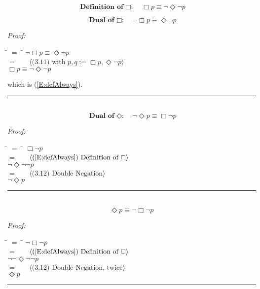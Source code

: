 \documentclass[fleqn, leqno]{article}
\newcommand{\lgap}{2pt}                             %
\newcommand{\mymathindent}{24pt}                      %
\newcommand{\Event}{\Diamond}
\newcommand{\Always}{\Box}
\newcommand{\myqed}{\hfill\rule[-.23ex]{1.2ex}{2.0ex}}
\newcommand{\Gll} {\langle}                         %
\newcommand{\Ggg} {\rangle}                         %
\newcommand{\Hint}[1]     {\ \ \ $\Gll              \mbox{#1} \Ggg$ }   %
\begin{document}
\begin{equation}\label{E:defAlways}
\textbf{Definition of $\Always$:}\quad \Always p \equiv \lnot\Event\lnot p
\end{equation}

\begin{equation}\label{E:dualAlways}
\textbf{Dual of $\Always$:}\quad \lnot\Always p \equiv \Event\lnot p
\end{equation}

\emph{Proof:}
\begin{tabbing}
\hspace{\mymathindent} \= $= \;$ \= \kill
  \> \>   $\lnot\Always p \equiv \Event\lnot p$\\[\lgap]
  \> $=$  \>  \Hint{(3.11) with $p,q := \Always p, \Event\lnot p$}\\[\lgap]
  \> \>   $\Always p \equiv \lnot\Event\lnot p$
\end{tabbing}
which is (\ref{E:defAlways}). \myqed\\[\lgap]


\begin{equation}\label{E:dualEvent}
\textbf{Dual of $\Event$:}\quad \lnot\Event p \equiv \Always\lnot p
\end{equation}

\emph{Proof:}
\begin{tabbing}
\hspace{\mymathindent} \= $= \;$ \= \kill
  \> \>   $\Always\lnot p$\\[\lgap]
  \> $=$  \>  \Hint{(\ref{E:defAlways}) Definition of $\Always$}\\[\lgap]
  \> \>   $\lnot\Event\lnot\lnot p$\\[\lgap]
  \> $=$  \>  \Hint{(3.12) Double Negation}\\[\lgap]
  \> \>   $\lnot\Event p$\\[\lgap]
\end{tabbing}
\myqed\\[\lgap]


\begin{equation}\label{E:eventAsAlways}
\Event p \equiv \lnot\Always\lnot p
\end{equation}

\emph{Proof:}
\begin{tabbing}
\hspace{\mymathindent} \= $= \;$ \= \kill
  \> \>   $\lnot\Always\lnot p$\\[\lgap]
  \> $=$  \>  \Hint{(\ref{E:defAlways}) Definition of $\Always$}\\[\lgap]
  \> \>   $\lnot\lnot\Event\lnot\lnot p$\\[\lgap]
  \> $=$  \>  \Hint{(3.12) Double Negation, twice}\\[\lgap]
  \> \>   $\Event p$\\[\lgap]
\end{tabbing}
\myqed\\[\lgap]
\end{document}
